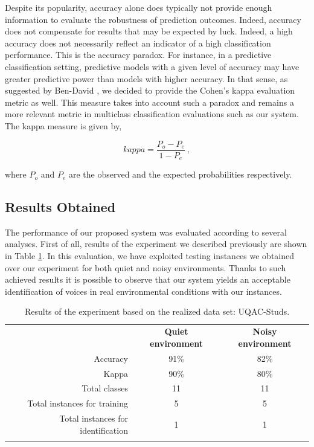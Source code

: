 \documentclass[cryptography,article,submit,moreauthors,pdftex,10pt,a4paper]{mdpi}
\begin{document}
Despite its popularity, accuracy alone does typically not provide enough information to evaluate the robustness of prediction outcomes. Indeed, accuracy does not compensate for results that may be expected by luck. Indeed, a high accuracy does not necessarily reflect an indicator of a high classification performance. This is the accuracy paradox. For instance, in a predictive classification setting, predictive models with a given level of accuracy may have greater predictive power than models with higher accuracy. In that sense, as suggested by Ben-David \cite{35}, we decided to provide the Cohen\textquoteright s kappa evaluation metric as well. This measure takes into account such a paradox and remains a more relevant metric in multiclass classification evaluations such as our system. The kappa measure is given by,

\begin{equation}
\label{eq:16}
  	kappa = \frac{P_o-P_e}{1-P_e}~,
\end{equation}

\noindent where $P_o$ and $P_e$ are the observed and the expected probabilities respectively.

\subsection{Results Obtained}

The performance of our proposed system was evaluated according to several analyses. First of all, results of the experiment we described previously are shown in Table \ref{tab:2}. In this evaluation, we have exploited testing instances we obtained over our experiment for both quiet and noisy environments. Thanks to such achieved results it is possible to observe that our system yields an acceptable identification of voices in real environmental conditions with our instances.

\begin{table}[H]
\caption{Results of the experiment based on the realized data set: UQAC-Studs.}
\centering
\label{tab:2}
	\begin{tabular}{rcc}
		\noalign{\smallskip}\hline\noalign{\smallskip}
		& \textbf{Quiet environment} & \textbf{Noisy environment}\\
		\noalign{\smallskip}\hline\noalign{\smallskip}
		Accuracy & 91\% & 82\%\\		
		Kappa & 90\% & 80\%\\
		Total classes & 11 & 11\\
		Total instances for training & 5 & 5\\
		Total instances for identification & 1 & 1\\
		\noalign{\smallskip}\hline
	\end{tabular}
\end{table}
\end{document}
